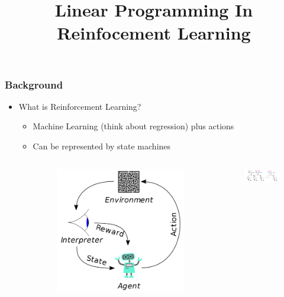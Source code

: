 \documentclass[aspectratio=169]{beamer}
\title{Linear Programming In Reinfocement Learning}
\date{}
\begin{document}
\begin{frame}
	\maketitle

\end{frame}
\begin{frame}
	\frametitle{Background}
	\begin{itemize}
		\item What is Reinforcement Learning?
			\begin{itemize}
				\item Machine Learning (think about regression) plus actions
				\item Can be represented by state machines
				\begin{columns}
	
					\begin{column}{0.5\textwidth}
						\begin{figure}
							\centering
							\includegraphics[scale=.1]{rl.png}
						\end{figure}
					\end{column}

					\begin{column}{0.5\textwidth}
					\begin{figure}
						\centering
						\includegraphics[scale=.4]{state_machine_1.png}
					\end{figure}
					\end{column}


\end{columns}
\end{itemize}
\end{itemize}
\end{frame}
\end{document}

